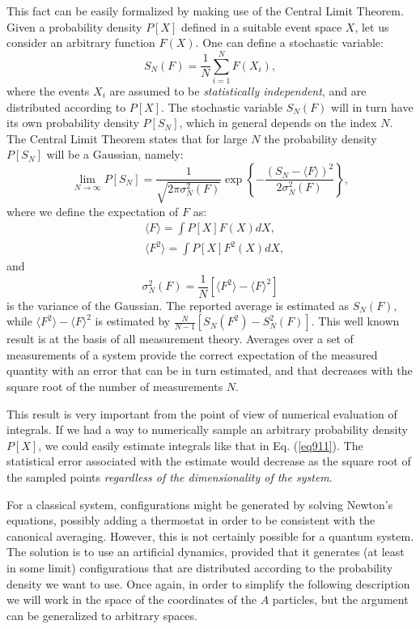 This fact can be easily formalized by making use of the Central Limit Theorem. Given a probability density $P[X]$ defined in a suitable event space $X$, let us consider an arbitrary function $F(X)$. One can define a stochastic variable:
\begin{equation}
S_N(F)=\frac{1}{N}\sum_{i=1}^{N}F(X_i),
\end{equation}
where the events $X_i$ are assumed to be {\it statistically independent}, and are distributed according to $P[X]$. The stochastic variable $S_N(F)$ will in turn have its own probability density $P[S_N]$, which in general depends on the index $N$. The Central Limit Theorem states that for large $N$ the probability density $P[S_N]$ will be a Gaussian, namely:
\begin{equation}
\lim_{N\rightarrow \infty} P[S_N]=\frac{1}{\sqrt{2\pi\sigma^2_N(F)}}\exp\left\{\displaystyle-\frac{(S_N-\langle F\rangle)^2}{2\sigma^2_N(F)}\right\},
\end{equation}
where we define the expectation of $F$ as:
\begin{equation}
\begin{split}
&\langle F\rangle=\int P[X]F(X)dX,
\\
&\langle F^2\rangle=\int P[X]F^2(X)dX,
\end{split}
\end{equation}
and
\begin{equation}
\sigma^2_N(F)=\frac{1}{N}\left[\langle F^2\rangle-\langle F\rangle^2\right]
\end{equation}
is the variance of the Gaussian.
The reported average is estimated as $S_N(F)$, while 
$\langle F^2\rangle-\langle F\rangle^2$ is estimated by
$\frac{N}{N-1}\left [S_N(F^2)-S_N^2(F)\right ]$.
This well known result is at the basis of all measurement theory. Averages over a set of measurements of a system provide the correct expectation of the measured quantity with an error that can be in turn estimated, and that decreases with the square root of the number of measurements $N$. 

This result is very important from the point of view of numerical evaluation of integrals. If we had a way to numerically sample an arbitrary probability density $P[X]$, we could easily estimate integrals like that in Eq. (\ref{eq911}). The statistical error associated with the estimate would decrease as the square root of the sampled points {\it regardless of the dimensionality of the system}. 

For a classical system, configurations might be generated by solving Newton's equations, possibly adding a thermostat in order to be consistent with the canonical averaging. However, this is not certainly possible for a quantum system. The solution is to use an artificial dynamics, provided that it generates (at least in some limit) configurations that are distributed according to the probability density we want to use. Once again, in order to simplify the following description we will work in the space of the coordinates of the $A$ particles, but the argument can be generalized to arbitrary spaces.

